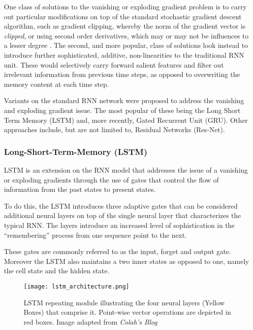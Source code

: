 \documentclass[../../fyp.tex]{subfiles}
\begin{document}
One class of solutions to the vanishing or exploding gradient problem is to carry out particular modifications on top of the standard stochastic gradient descent algorithm, such as gradient clipping, whereby the norm of the gradient vector is \textit{clipped}, or using second order derivatives, which may or may not be influences to a lesser degree \citep{chung2014}.
The second, and more popular, class of solutions look instead to introduce further sophisticated, additive, non-linearities to the traditional RNN unit. These would selectively carry forward salient features and filter out irrelevant information from previous time steps, as opposed to overwriting the memory content at each time step.

Variants on the standard RNN network were proposed to address the vanishing and exploding gradient issue. The most popular of these being the Long Short Term Memory (LSTM) and, more recently, Gated Recurrent Unit (GRU). Other approaches include, but are not limited to, Residual Networks (Res-Net).

\subsubsection{Long-Short-Term-Memory (LSTM)}
LSTM \citep{hochreiter1997} is an extension on the RNN model that addresses the issue of a vanishing or exploding gradients through the use of gates that control the flow of information from the past states to present states.

To do this, the LSTM introduces three adaptive gates that can be considered additional neural layers on top of the single neural layer that characterizes the typical RNN. The layers introduce an increased level of sophistication in the \enquote{remembering} process from one sequence point to the next.

These gates are commonly referred to as the input, forget and output gate. Moreover the LSTM also maintains a two inner states as opposed to one, namely the cell state and the hidden state.

\begin{figure}[!ht]
	\centering
	\texttt{[image: lstm\_architecture.png]}
	\caption{LSTM repeating module illustrating the four neural layers (Yellow Boxes) that comprise it. Point-wise vector operations are depicted in red boxes. Image adapted from \textit{Colah's Blog}\citep{colah-understanding-lstm}}
	\label{fig:lstm_architecture}
\end{figure}
\end{document}
